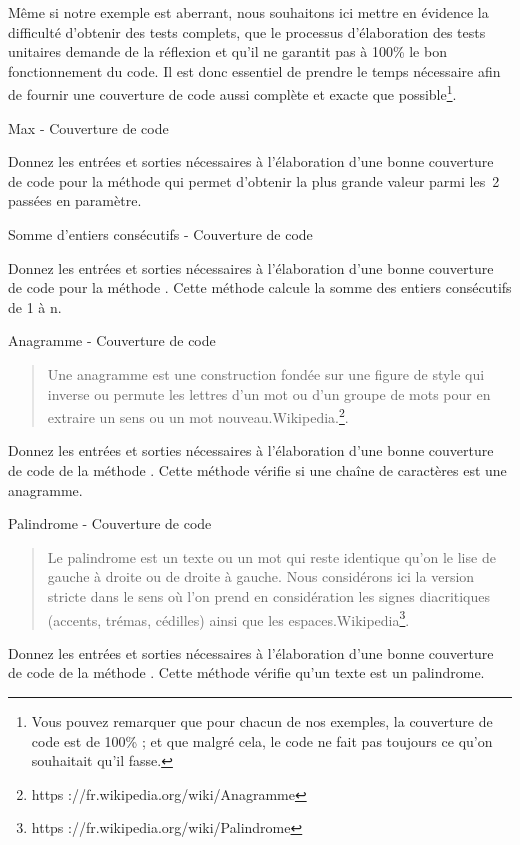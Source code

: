 \documentclass[a4paper,11pt]{style-esi/td}
\begin{document}
	Même si notre exemple est aberrant, nous souhaitons ici mettre en évidence la difficulté d'obtenir des tests complets, que le processus d’élaboration des tests unitaires demande de la réflexion et qu’il ne garantit pas à 100\% le bon fonctionnement du code. Il est donc essentiel de prendre le temps nécessaire afin de fournir une couverture de code aussi complète et exacte que possible\footnote{Vous pouvez remarquer que pour chacun de nos exemples, la couverture de code est de 100\% ; et que malgré cela, le code ne fait pas toujours ce qu'on souhaitait qu'il fasse.}.

	\begin{Exercice}{Max - Couverture de code}
		
		Donnez les entrées et sorties nécessaires à l’élaboration d’une bonne
		couverture de code pour la méthode  qui
		permet d’obtenir la plus grande valeur parmi les~2 passées en
		paramètre.
	\end{Exercice}

	\begin{Exercice}{Somme d'entiers consécutifs - Couverture de code}
		
		Donnez les entrées et sorties nécessaires à l’élaboration d’une bonne couverture de code pour la méthode . Cette méthode calcule la somme des entiers consécutifs de 1 à n.
	\end{Exercice}

	\begin{Exercice}{Anagramme - Couverture de code}
		\begin{quote}
		\og Une anagramme est une construction fondée sur une figure de style qui inverse ou permute les lettres d’un mot ou d’un groupe de mots pour en extraire un sens ou un mot nouveau.\fg Wikipedia.\footnote{https ://fr.wikipedia.org/wiki/Anagramme}. 
		\end{quote}
		Donnez les entrées et sorties nécessaires à l’élaboration d’une bonne couverture de code de la méthode . Cette méthode vérifie si une chaîne de caractères est une anagramme.
	\end{Exercice}

	\begin{Exercice}{Palindrome - Couverture de code}
		\begin{quote}
		\og Le palindrome est un texte ou un mot qui reste identique qu’on le lise de gauche à droite ou de droite à gauche. Nous considérons ici la version stricte dans le sens où l’on prend en considération les signes diacritiques (accents, trémas, cédilles) ainsi que les espaces.\fg Wikipedia\footnote{https ://fr.wikipedia.org/wiki/Palindrome}.
		\end{quote}

		Donnez les entrées et sorties nécessaires à l’élaboration d’une bonne couverture de code de la méthode . Cette méthode vérifie qu'un texte est un palindrome.
	\end{Exercice}
\end{document}
